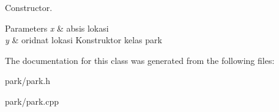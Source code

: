 Constructor. 


\begin{DoxyParams}{Parameters}
{\em x} & absis lokasi \\
\hline
{\em y} & oridnat lokasi Konstruktor kelas park \\
\hline
\end{DoxyParams}


The documentation for this class was generated from the following files\+:\begin{DoxyCompactItemize}
\item 
park/park.\+h\item 
park/park.\+cpp\end{DoxyCompactItemize}

